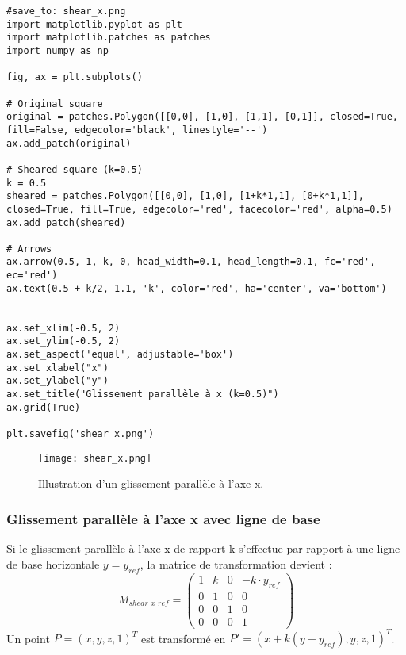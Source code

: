 \documentclass{article}
\begin{document}
\begin{verbatim}
#save_to: shear_x.png
import matplotlib.pyplot as plt
import matplotlib.patches as patches
import numpy as np

fig, ax = plt.subplots()

# Original square
original = patches.Polygon([[0,0], [1,0], [1,1], [0,1]], closed=True, fill=False, edgecolor='black', linestyle='--')
ax.add_patch(original)

# Sheared square (k=0.5)
k = 0.5
sheared = patches.Polygon([[0,0], [1,0], [1+k*1,1], [0+k*1,1]], closed=True, fill=True, edgecolor='red', facecolor='red', alpha=0.5)
ax.add_patch(sheared)

# Arrows
ax.arrow(0.5, 1, k, 0, head_width=0.1, head_length=0.1, fc='red', ec='red')
ax.text(0.5 + k/2, 1.1, 'k', color='red', ha='center', va='bottom')


ax.set_xlim(-0.5, 2)
ax.set_ylim(-0.5, 2)
ax.set_aspect('equal', adjustable='box')
ax.set_xlabel("x")
ax.set_ylabel("y")
ax.set_title("Glissement parallèle à x (k=0.5)")
ax.grid(True)

plt.savefig('shear_x.png')
\end{verbatim}

\begin{figure}[H]
\centering
\texttt{[image: shear\_x.png]}
\caption{Illustration d'un glissement parallèle à l'axe x.}
\label{fig:shear_x}
\end{figure}

\subsubsection{Glissement parallèle à l'axe x avec ligne de base}
Si le glissement parallèle à l'axe x de rapport k s'effectue par rapport à une ligne de base horizontale $y = y_{ref}$, la matrice de transformation devient :
\[
M_{shear\_x\_ref} = \begin{pmatrix}
1 & k & 0 & -k \cdot y_{ref} \\
0 & 1 & 0 & 0 \\
0 & 0 & 1 & 0 \\
0 & 0 & 0 & 1
\end{pmatrix}
\]
Un point $P = (x, y, z, 1)^T$ est transformé en $P' = (x + k(y - y_{ref}), y, z, 1)^T$.
\end{document}
